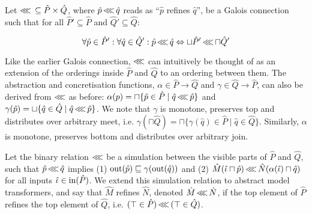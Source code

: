 


Let $\operatorname{\lll} \, \subseteq \hat P \times \hat Q$, where $\hat p \operatorname{\lll} \hat q$ reads as ``$\hat p$ refines $\hat q$'', be a Galois connection such that for all $\hat P' \subseteq \hat P$ and $\hat Q' \subseteq \hat Q$:

\begin{equation*}
\forall \hat p \in \hat P' : \forall \hat q \in \hat Q' : \hat p \operatorname{\lll} \hat q \Leftrightarrow \sqcup \hat P' \operatorname{\lll} \sqcap \hat Q'
\end{equation*}

\noindent Like the earlier Galois connection, $\operatorname{\lll}$ can intuitively be thought of as an extension of the orderings inside $\hat P$ and $\hat Q$ to an ordering between them. The abstraction and concretisation functions, $\alpha \in \hat P \rightarrow \hat Q$ and $\gamma \in \hat Q \rightarrow \hat P$, can also be derived from $\operatorname{\lll}$ as before: $\alpha(p) = \sqcap \{ \hat p \in \hat P \mid \hat q \operatorname{\lll} \hat p \}$ and $\gamma(\hat p) = \sqcup \{ \hat q \in \hat Q \mid \hat q \operatorname{\lll} \hat p \}$. We note that $\gamma$ is monotone, preserves top and distributes over arbitrary meet, i.e. $\gamma(\sqcap \hat Q) = \sqcap \{ \gamma(\hat q) \in \hat P \mid \hat q \in \hat Q\}$. Similarly, $\alpha$ is monotone, preserves bottom and distributes over arbitrary join.

Let the binary relation $\operatorname{\lll}$ be a simulation between the visible parts of $\hat P$ and $\hat Q$, such that $\hat p \operatorname{\lll} \hat q$ implies (1) $\operatorname{out}(\hat p) \sqsubseteq \gamma(\operatorname{out}(\hat q))$ and (2) $\hat M(\hat \iota \sqcap \hat p) \operatorname{\lll} \hat N(\alpha(\hat \iota) \sqcap \hat q)$ for all inputs $\hat \iota \in \operatorname{in}(\hat P)$. We extend this simulation relation to abstract model transformers, and say that $\hat M$ refines $\hat N$, denoted $\hat M \operatorname{\lll} \hat N$, if the top element of $\hat P$ refines the top element of $\hat Q$, i.e. $(\top \in \hat P) \operatorname{\lll} \, (\top \in \hat Q)$. 

